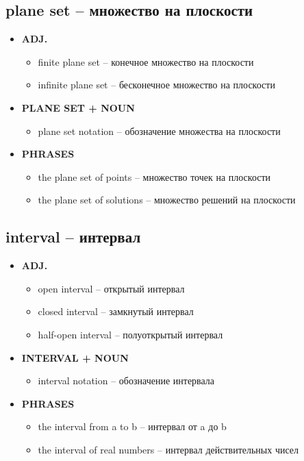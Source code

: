 \documentclass[a4paper, 10pt]{article}
\theoremstyle{definition}
\theoremstyle{plain}
\theoremstyle{remark}
\begin{document}
\subsection{plane set – множество на плоскости}

\begin{itemize}
    \item \textbf{ADJ.}
    \begin{itemize}
        \item finite plane set – конечное множество на плоскости
        \item infinite plane set – бесконечное множество на плоскости
    \end{itemize}
    
    \item \textbf{PLANE SET + NOUN}
    \begin{itemize}
        \item plane set notation – обозначение множества на плоскости
    \end{itemize}
    
    \item \textbf{PHRASES}
    \begin{itemize}
        \item the plane set of points – множество точек на плоскости
        \item the plane set of solutions – множество решений на плоскости
    \end{itemize}
\end{itemize}

\subsection{interval – интервал}

\begin{itemize}
    \item \textbf{ADJ.}
    \begin{itemize}
        \item open interval – открытый интервал
        \item closed interval – замкнутый интервал
        \item half-open interval – полуоткрытый интервал
    \end{itemize}
    
    \item \textbf{INTERVAL + NOUN}
    \begin{itemize}
        \item interval notation – обозначение интервала
    \end{itemize}
    
    \item \textbf{PHRASES}
    \begin{itemize}
        \item the interval from a to b – интервал от a до b
        \item the interval of real numbers – интервал действительных чисел
    \end{itemize}
\end{itemize}
\end{document}
